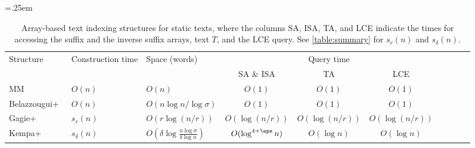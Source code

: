 
\begin{table}[t]\centering\tabcolsep=.25em
\caption{Array-based text indexing structures for static texts, where
the columns SA, ISA, TA, and LCE indicate the times for accessing the  suffix and the inverse suffix arrays, text $T$, and the LCE query. See \cref{table:summary} for $s_r(n)$  and $s_\delta(n)$. 
}\label{table:arrays}
\medskip
\begin{tabular}{l>{\centering}p{5em}>{\centering}p{7em}cccclll}\toprule
Structure	& Construct\-ion time   & Space (words) & \multicolumn{3}{c}{Query time}	\\
\cmidrule{4-6}
& &  & SA \& ISA	& TA	& LCE	 \\
  \midrule
MM~\cite{manber:myers1993suffixarrays}	& $O(n)$   & $O(n)$	& $O(1)$	& $O(1)$	& $O(1)$	\\
Belazzougui+~\cite{belazzougui2020linear} & $O(n)$   & $O(n\log n/\log\sigma)$	& $O(1)$	& $O(1)$	& $O(1)$	\\
Gagie+~\cite{gagie:navarro:prezza2020fully}	& $s_r(n)$   & $O(r\log(n/r))$	& $O(\log(n/r))$	& $O(\log(n/r))$	& $O(\log(n/r))$	\\
Kempa+~\cite{kempa:kociumaka2023collapsing}	& $s_\delta(n)$   & $O(\delta \log\frac{n\log\sigma}{\delta\log n})$	& $O(\log^{4+\eps} n)$	& $O(\log n)$	& $O(\log n)$	\\
\bottomrule
\end{tabular}
\end{table}


